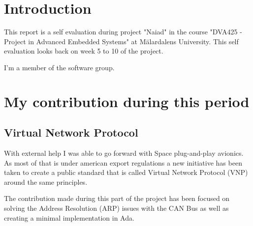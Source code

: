 \section{Introduction}
This report is a self evaluation during project "Naiad" in the course
"DVA425 - Project in Advanced Embedded Systems" at M\"{a}lardalens University.
This self evaluation looks back on week 5 to 10 of the project.

I'm a member of the software group.

\section{My contribution during this period}

\subsection{Virtual Network Protocol}
With external help I was able to go forward with Space plug-and-play avionics.
As most of that is under american export regulations a new initiative has been
taken to create a public standard that is called Virtual Network Protocol (VNP)
around the same principles.

The contribution made during this part of the project has been focused on
solving the Address Resolution (ARP) issues with the CAN Bus as well as creating a minimal implementation
in Ada.


